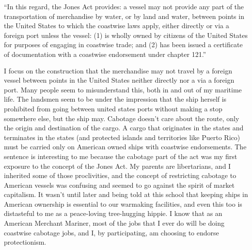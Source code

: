 
\date{Admiralty Law -- 13 March 2024}


\begin{flushleft}
\thetitle

\thedate

\theauthor
\end{flushleft}

``In this regard, the Jones Act provides: a vessel may not provide any part of the transportation of merchandise by water, or by land and water, between points in the United States to which the coastwise laws apply, either directly or via a foreign port unless the vessel: (1) is wholly owned by citizens of the United States for purposes of engaging in coastwise trade; and (2) has been issued a certificate of documentation with a coastwise endorsement under chapter 121.''  %

I focus on the construction that the merchandise may not travel by a foreign vessel between points in the United States neither directly nor a via a foreign port. Many people seem to misunderstand this, both in and out of my maritime life. The landsmen seem to be under the impression that the ship herself is prohibited from going between united states ports without making a stop somewhere else, but the ship may. Cabotage doesn’t care about the route, only the origin and destination of the cargo. A cargo that originates in the states and terminates in the states (and protected islands and territories like Puerto Rico) must be carried only on American owned ships with coastwise endorsements.
The sentence is interesting to me because the cabotage part of the act was my first exposure to the concept of the Jones Act. My parents are libertarians, and I inherited some of those proclivities, and the concept of restricting cabotage to American vessels was confusing and seemed to go against the spirit of market capitalism. It wasn’t until later and being told at this school that keeping ships in American ownership is essential to our warmaking facilities, and even this too is distasteful to me as a peace-loving tree-hugging hippie. I know that as an American Merchant Mariner, most of the jobs that I ever do will be doing coastwise cabotage jobs, and I, by participating, am choosing to endorse protectionism. 

